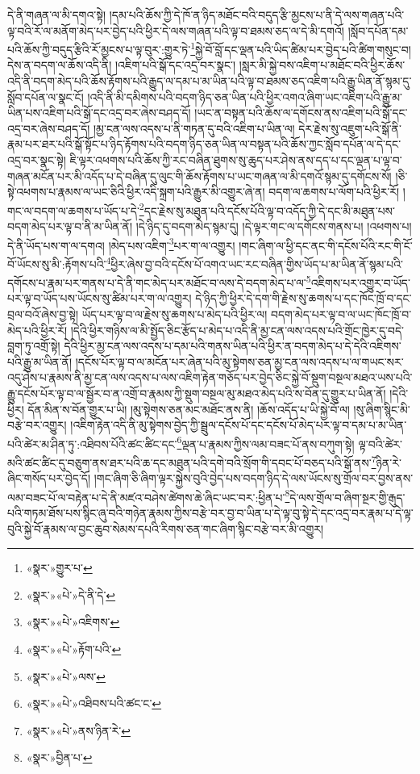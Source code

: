 དེ་ནི་གཞན་ལ་མི་དགའ་སྟེ། །དམ་པའི་ཆོས་ཀྱི་དེ་ཁོ་ན་ཉིད་མཐོང་བའི་བདུད་རྩི་མྱངས་པ་ནི་དེ་ལས་གཞན་པའི་ལྟ་བའི་རོ་ལ་མནོག་མེད་པར་བྱེད་པའི་ཕྱིར་དེ་ལས་གཞན་པའི་ལྟ་བ་ཐམས་ཅད་ལ་དེ་མི་དགའོ། །སློབ་དཔོན་དམ་པའི་ཆོས་ཀྱི་བདུད་རྩིའི་རོ་མྱངས་པ་ལྟ་བུར་:གྱུར་ཏེ་\footnote{«སྣར་»གྱུར་པ་}སྐྱེ་བོ་བློ་དང་ལྡན་པའི་ཡིད་ཚིམ་པར་བྱེད་པའི་ཚིག་གསུང་བ། དེས་ན་བདག་ལ་ཆོས་འདི་ནི། །འཇིག་པའི་སྒོ་དང་འདྲ་བར་སྣང་། །སླར་མི་སྐྱེ་བས་འཇིག་པ་མཐོང་བའི་ཕྱིར་ཆོས་འདི་ནི་བདག་མེད་པའི་ཆོས་རྟོགས་པའི་རྒྱུད་ལ་དམ་པ་མ་ཡིན་པའི་ལྟ་བ་ཐམས་ཅད་འཇིག་པའི་རྒྱུ་ཡིན་ནོ་སྙམ་དུ་སློབ་དཔོན་ལ་སྣང་ངོ། །འདི་ནི་མི་དམིགས་པའི་བདག་ཉིད་ཅན་ཡིན་པའི་ཕྱིར་འགའ་ཞིག་ཡང་འཇིག་པའི་རྒྱུ་མ་ཡིན་པས་འཇིག་པའི་སྒོ་དང་འདྲ་བར་ཞེས་བཤད་དོ། །ཡང་ན་བསྟན་པའི་ཆོས་ལ་དགོངས་ནས་འཇིག་པའི་སྒོ་དང་འདྲ་བར་ཞེས་བཤད་དོ། །མྱ་ངན་ལས་འདས་པ་ནི་གཏན་དུ་བའི་འཇིག་པ་ཡིན་ལ། དེར་རྗེས་སུ་འཇུག་པའི་སྒོ་ནི་རྣམ་པར་ཐར་པའི་སྒོ་སྟོང་པ་ཉིད་རྟོགས་པའི་བདག་ཉིད་ཅན་ཡིན་ལ་བསྟན་པའི་ཆོས་ཀྱང་སློབ་དཔོན་ལ་དེ་དང་འདྲ་བར་སྣང་སྟེ། ཇི་ལྟར་འཕགས་པའི་ཆོས་ཀྱི་རང་བཞིན་ཐུགས་སུ་ཆུད་པར་ཤེས་ནས་དད་པ་དང་ལྡན་པ་ལྟ་བ་གཞན་མངོན་པར་མི་འདོད་པ་དེ་བཞིན་དུ་ལུང་གི་ཆོས་རྟོགས་པ་ཡང་གཞན་ལ་མི་དགའོ་སྙམ་དུ་དགོངས་སོ། །ཅི་སྟེ་འཕགས་པ་རྣམས་ལ་ཡང་ཅིའི་ཕྱིར་འདི་སྐྲག་པའི་རྒྱུར་མི་འགྱུར་ཞེ་ན། བདག་ལ་ཆགས་པ་ལོག་པའི་ཕྱིར་རོ། །གང་ལ་བདག་ལ་ཆགས་པ་ཡོད་པ་དེ་\footnote{«སྣར་»«པེ་»དེ་ནི་དེ་}དང་རྗེས་སུ་མཐུན་པའི་དངོས་པོའི་ལྟ་བ་འདོད་ཀྱི་དེ་དང་མི་མཐུན་པས་བདག་མེད་པར་ལྟ་བ་ནི་མ་ཡིན་ནོ། །དེ་ཉིད་དུ་བདག་མེད་སྙམ་དུ། །དེ་ལྟར་གང་ལ་དགོངས་གནས་པ། །འཕགས་པ། དེ་ནི་ཡོད་པས་ག་ལ་དགའ། །མེད་པས་འཇིག་\footnote{«སྣར་»«པེ་»འཇིགས་}པར་ག་ལ་འགྱུར། །གང་ཞིག་ལ་ཕྱི་དང་ནང་གི་དངོས་པོའི་རང་གི་ངོ་བོ་ཡོངས་སུ་མི་:རྟོགས་པའི་\footnote{«སྣར་»«པེ་»རྟོག་པའི་}ཕྱིར་ཞེས་བྱ་བའི་དངོས་པོ་འགའ་ཡང་རང་བཞིན་གྱིས་ཡོད་པ་མ་ཡིན་ནོ་སྙམ་པའི་དགོངས་པ་རྣམ་པར་གནས་པ་དེ་ནི་གང་མེད་པར་མཐོང་བ་ལས་དེ་བདག་མེད་པ་ལ་\footnote{«སྣར་»«པེ་»ལས་}འཇིགས་པར་འགྱུར་བ་ཡོད་པར་ལྟ་བ་ཡོད་པས་ཡོངས་སུ་ཚིམ་པར་ག་ལ་འགྱུར། དེ་ཉིད་ཀྱི་ཕྱིར་དེ་དག་གི་རྗེས་སུ་ཆགས་པ་དང་ཁོང་ཁྲོ་བ་དང་བྲལ་བའོ་ཞེས་བྱ་སྟེ། ཡོད་པར་ལྟ་བ་ལ་རྗེས་སུ་ཆགས་པ་མེད་པའི་ཕྱིར་ལ། བདག་མེད་པར་ལྟ་བ་ལ་ཡང་ཁོང་ཁྲོ་བ་མེད་པའི་ཕྱིར་རོ། །དེའི་ཕྱིར་གཉིས་ལ་མི་སྤྱོད་ཅིང་རྩོད་པ་མེད་པ་འདི་ནི་མྱ་ངན་ལས་འདས་པའི་གྲོང་ཁྱེར་དུ་བདེ་བླག་ཏུ་འགྲོ་སྟེ། དེའི་ཕྱིར་མྱ་ངན་ལས་འདས་པ་དམ་པའི་གནས་ཡིན་པའི་ཕྱིར་ན་བདག་མེད་པ་དེ་དེའི་འཇིགས་པའི་རྒྱུ་མ་ཡིན་ནོ། །དངོས་པོར་ལྟ་བ་ལ་མངོན་པར་ཞེན་པའི་མུ་སྟེགས་ཅན་མྱ་ངན་ལས་འདས་པ་ལ་གཡང་སར་འདུ་ཤེས་པ་རྣམས་ནི་མྱ་ངན་ལས་འདས་པ་ལས་འཇིག་རྟེན་གཅོད་པར་བྱེད་ཅིང་སྐྱེ་བོ་སྡུག་བསྔལ་མཐའ་ཡས་པའི་རྒྱུ་དངོས་པོར་ལྟ་བ་ལ་སྦྱོར་བ་ན་འགྲོ་བ་རྣམས་ཀྱི་སྡུག་བསྔལ་མུ་མཐའ་མེད་པའི་ས་བོན་དུ་གྱུར་པ་ཡིན་ནོ། །དེའི་ཕྱིར། དོན་མིན་ས་བོན་གྱུར་པ་ཡི། །མུ་སྟེགས་ཅན་མང་མཐོང་ནས་ནི། །ཆོས་འདོད་པ་ཡི་སྐྱེ་བོ་ལ། །སུ་ཞིག་སྙིང་མི་བརྩེ་བར་འགྱུར། །འཇིག་རྟེན་འདི་ནི་མུ་སྟེགས་བྱེད་ཀྱི་སྦྲུལ་དངོས་པོ་དང་དངོས་པོ་མེད་པར་ལྟ་བ་དམ་པ་མ་ཡིན་པའི་ཚེར་མ་ཤིན་ཏུ་:འཐིབས་པོའི་ཚང་ཚིང་དང་\footnote{«སྣར་»«པེ་»འཐིབས་པའི་ཚང་ང་}ལྡན་པ་རྣམས་ཀྱིས་ལམ་བཟང་པོ་ནས་བཀུག་སྟེ། ལྟ་བའི་ཚེར་མའི་ཚང་ཚིང་དུ་བཅུག་ནས་ཐར་པའི་ཆ་དང་མཐུན་པའི་དགེ་བའི་སྲོག་གི་དབང་པོ་བཅད་པའི་སྒོ་ནས་\footnote{«སྣར་»«པེ་»ནས་ཉིན་རེ་}ཉིན་རེ་ཞིང་གསོད་པར་བྱེད་དོ། །གང་ཞིག་ཅི་ཞིག་ལྟར་སྐྱེས་བུའི་བྱེད་པས་བདག་ཉིད་དེ་ལས་ཡོངས་སུ་གྲོལ་བར་བྱས་ནས་ལམ་བཟང་པོ་ལ་བརྟེན་པ་དེ་ནི་མཛའ་བཤེས་ཚེགས་ཆེ་ཞིང་ཡང་བར་:ཕྱིན་པ་\footnote{«སྣར་»བྱིན་པ་}དེ་ལས་གྲོལ་བ་ཞིག་སྔར་གྱི་རྒུད་པའི་གཏམ་ཐོས་པས་སྙིང་ཞུ་བའི་གཉེན་རྣམས་ཀྱིས་བརྩེ་བར་བྱ་བ་ཡིན་པ་དེ་ལྟ་བུ་སྟེ་དེ་དང་འདྲ་བར་རྣམ་པ་དེ་ལྟ་བུའི་སྐྱེ་བོ་རྣམས་ལ་བྱང་ཆུབ་སེམས་དཔའི་རིགས་ཅན་གང་ཞིག་སྙིང་བརྩེ་བར་མི་འགྱུར། 
